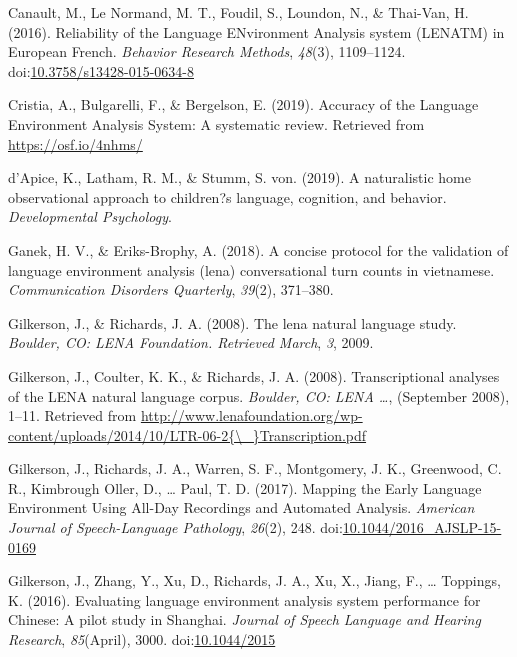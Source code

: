 \documentclass[english,floatsintext,man]{apa6}
\begin{document}
\hypertarget{ref-Canault2016}{}
Canault, M., Le Normand, M. T., Foudil, S., Loundon, N., \& Thai-Van, H.
(2016). Reliability of the Language ENvironment Analysis system (LENATM)
in European French. \emph{Behavior Research Methods}, \emph{48}(3),
1109--1124.
doi:\href{https://doi.org/10.3758/s13428-015-0634-8}{10.3758/s13428-015-0634-8}

\hypertarget{ref-Cristia}{}
Cristia, A., Bulgarelli, F., \& Bergelson, E. (2019). Accuracy of the
Language Environment Analysis System: A systematic review. Retrieved
from \url{https://osf.io/4nhms/}

\hypertarget{ref-d2019naturalistic}{}
d'Apice, K., Latham, R. M., \& Stumm, S. von. (2019). A naturalistic
home observational approach to children?s language, cognition, and
behavior. \emph{Developmental Psychology}.

\hypertarget{ref-ganek2018concise}{}
Ganek, H. V., \& Eriks-Brophy, A. (2018). A concise protocol for the
validation of language environment analysis (lena) conversational turn
counts in vietnamese. \emph{Communication Disorders Quarterly},
\emph{39}(2), 371--380.

\hypertarget{ref-gilkerson2008lena}{}
Gilkerson, J., \& Richards, J. A. (2008). The lena natural language
study. \emph{Boulder, CO: LENA Foundation. Retrieved March}, \emph{3},
2009.

\hypertarget{ref-Gilkerson2008ltr6}{}
Gilkerson, J., Coulter, K. K., \& Richards, J. A. (2008).
Transcriptional analyses of the LENA natural language corpus.
\emph{Boulder, CO: LENA \ldots{}}, (September 2008), 1--11. Retrieved
from
\href{http://www.lenafoundation.org/wp-content/uploads/2014/10/LTR-06-2\%7B/_\%7DTranscription.pdf}{http://www.lenafoundation.org/wp-content/uploads/2014/10/LTR-06-2\{\textbackslash{}\_\}Transcription.pdf}

\hypertarget{ref-Gilkerson2017}{}
Gilkerson, J., Richards, J. A., Warren, S. F., Montgomery, J. K.,
Greenwood, C. R., Kimbrough Oller, D., \ldots{} Paul, T. D. (2017).
Mapping the Early Language Environment Using All-Day Recordings and
Automated Analysis. \emph{American Journal of Speech-Language
Pathology}, \emph{26}(2), 248.
doi:\href{https://doi.org/10.1044/2016_AJSLP-15-0169}{10.1044/2016\_AJSLP-15-0169}

\hypertarget{ref-Gilkerson2016}{}
Gilkerson, J., Zhang, Y., Xu, D., Richards, J. A., Xu, X., Jiang, F.,
\ldots{} Toppings, K. (2016). Evaluating language environment analysis
system performance for Chinese: A pilot study in Shanghai. \emph{Journal
of Speech Language and Hearing Research}, \emph{85}(April), 3000.
doi:\href{https://doi.org/10.1044/2015}{10.1044/2015}
\end{document}
